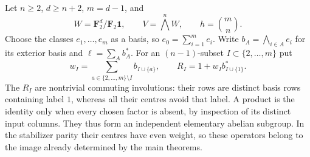 Let $n\ge2$, $d\ge n+2$, $m=d-1$, and
\[
W=\mathbf F_2^d/\mathbf F_2\mathbf1,
\qquad V=\bigwedge^nW,
\qquad h=\binom mn.
\]
Choose the classes $e_1,\ldots,e_m$ as a basis, so $e_0=\sum_{i=1}^m e_i$. Write $b_A=\bigwedge_{i\in A}e_i$ for its exterior basis and $\ell=\sum_A b_A^*$. For an $(n-1)$-subset $I\subset\{2,\ldots,m\}$ put
\[
w_I=\sum_{a\in\{2,\ldots,m\}\setminus I}b_{I\cup\{a\}},
\qquad R_I=1+w_Ib_{I\cup\{1\}}^*.
\]
The $R_I$ are nontrivial commuting involutions: their rows are distinct basis rows containing label $1$, whereas all their centres avoid that label. A product is the identity only when every chosen factor is absent, by inspection of its distinct input columns. They thus form an independent elementary abelian subgroup. In the stabilizer parity their centres have even weight, so these operators belong to the image already determined by the main theorems.

